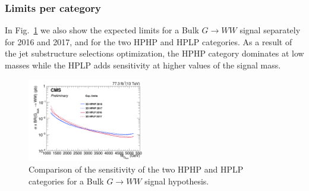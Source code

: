 \subsubsection{Limits per category}
\label{sec:limitcomparecat}
In Fig.~\ref{fig:limitsPerCat} we also show the expected limits for a Bulk $G\rightarrow WW$ signal separately for 2016 and 2017, and for the two HPHP and HPLP categories. As a result of the jet substructure selections optimization,
the HPHP category dominates at low masses while the HPLP adds sensitivity at higher values of the signal mass.
\begin{figure}[h!]
\centering
\includegraphics[width=0.45\textwidth]{figures/analysis/search3/AN-17-303/limits/limit_compare_BulkGWW_per_category.png}
\caption{Comparison of the sensitivity of the two HPHP and HPLP categories for a Bulk $G\rightarrow WW$ signal hypothesis.}
\label{fig:limitsPerCat}
\end{figure}

